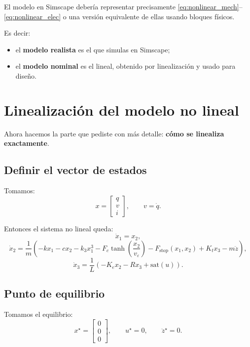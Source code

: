 \documentclass[11pt]{article}
\begin{document}
El modelo en Simscape deber\'ia representar precisamente \eqref{eq:nonlinear_mech}--\eqref{eq:nonlinear_elec} o una versi\'on equivalente de ellas usando bloques f\'isicos.

Es decir:

\begin{itemize}[leftmargin=1.2cm]
\item el \textbf{modelo realista} es el que simulas en Simscape;
\item el \textbf{modelo nominal} es el lineal, obtenido por linealizaci\'on y usado para dise\~no.
\end{itemize}

\section{Linealizaci\'on del modelo no lineal}

Ahora hacemos la parte que pediste con m\'as detalle: \textbf{c\'omo se linealiza exactamente}.

\subsection{Definir el vector de estados}

Tomamos:
\[
x=
\begin{bmatrix}
q\\
v\\
i
\end{bmatrix},
\qquad v=\dot q.
\]

Entonces el sistema no lineal queda:
\begin{equation}
\dot x_1 = x_2,
\end{equation}
\begin{equation}
\dot x_2 = \frac{1}{m}\left(
-kx_1 - cx_2 - k_3x_1^3 - F_c\tanh\left(\frac{x_2}{v_\varepsilon}\right)
-F_{\text{stop}}(x_1,x_2) + K_t x_3 - m\ddot z
\right),
\end{equation}
\begin{equation}
\dot x_3 = \frac{1}{L}\left(
-K_e x_2 - R x_3 + \mathrm{sat}(u)
\right).
\end{equation}

\subsection{Punto de equilibrio}

Tomamos el equilibrio:
\[
x^\star=
\begin{bmatrix}
0\\
0\\
0
\end{bmatrix},
\qquad
u^\star=0,
\qquad
\ddot z^\star=0.
\]
\end{document}
